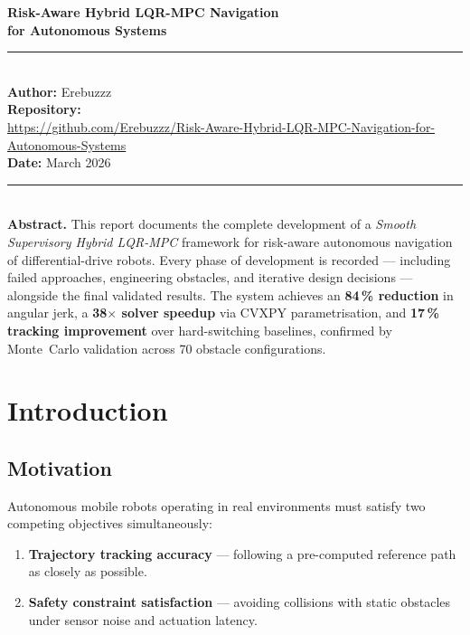 \documentclass[12pt,a4paper,oneside]{report}
\begin{document}
\begin{titlepage}\centering\vspace*{2cm}
{\Huge\bfseries Risk-Aware Hybrid LQR-MPC Navigation\\[0.4em]for Autonomous Systems\par}
\vspace{0.5cm}{\Large\itshape Comprehensive Technical Design \& Experimental Validation Report\par}
\vspace{1.5cm}\rule{0.8\linewidth}{0.4pt}\\[0.5cm]
{\large\textbf{Author:} Erebuzzz}\\[0.3cm]
{\large\textbf{Repository:}}\\[0.1cm]
\small\url{https://github.com/Erebuzzz/Risk-Aware-Hybrid-LQR-MPC-Navigation-for-Autonomous-Systems}\\[0.8cm]
{\large\textbf{Date:} March 2026}\\[2cm]
\rule{0.8\linewidth}{0.4pt}\\[0.5cm]
\noindent\textbf{Abstract.}
This report documents the complete development of a \textit{Smooth Supervisory Hybrid LQR-MPC} framework for risk-aware autonomous navigation of differential-drive robots. Every phase of development is recorded --- including failed approaches, engineering obstacles, and iterative design decisions --- alongside the final validated results. The system achieves an \textbf{84\,\% reduction} in angular jerk, a \textbf{38$\times$ solver speedup} via CVXPY parametrisation, and \textbf{17\,\% tracking improvement} over hard-switching baselines, confirmed by Monte~Carlo validation across 70 obstacle configurations.
\end{titlepage}

\tableofcontents
\listoftables
\clearpage

\chapter{Introduction}\label{ch:intro}

\section{Motivation}

Autonomous mobile robots operating in real environments must satisfy two
competing objectives simultaneously:
\begin{enumerate}
  \item \textbf{Trajectory tracking accuracy} --- following a pre-computed
    reference path as closely as possible.
  \item \textbf{Safety constraint satisfaction} --- avoiding collisions with
    static obstacles under sensor noise and actuation latency.
\end{enumerate}
\end{document}
